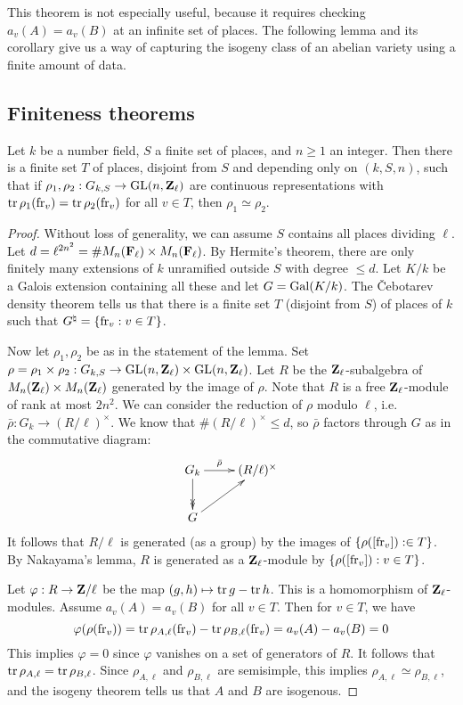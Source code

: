 This theorem is not especially useful, because it requires checking 
$a_v(A)=a_v(B)$ at an infinite set of places. The following lemma and its 
corollary give us a way of capturing the isogeny class of an abelian variety 
using a finite amount of data. 





\subsection{Finiteness theorems}

\begin{lemma}[Faltings]
Let $k$ be a number field, $S$ a finite set of places, and $n\geqslant 1$ an 
integer. Then there is a finite set $T$ of places, disjoint from $S$ and 
depending only on $(k,S,n)$, such that if 
$\rho_1,\rho_2:G_{k,S} \to \operatorname{GL}(n,\mathbf{Z}_\ell)$ are continuous representations 
with $\operatorname{tr}\rho_1(\mathrm{fr}_v) = \operatorname{tr} \rho_2(\mathrm{fr}_v)$ for all $v\in T$, then 
$\rho_1\simeq \rho_2$. 
\end{lemma}
\begin{proof}
Without loss of generality, we can assume $S$ contains all places dividing 
$\ell$. Let $d = \ell^{2 n^2} = \# M_n(\mathbf{F}_\ell)\times M_n(\mathbf{F}_\ell)$. By 
Hermite's theorem, there are only finitely many extensions of $k$ unramified 
outside $S$ with degree $\leqslant d$. Let $K/k$ be a Galois extension 
containing all these and let $G=\operatorname{Gal}(K/k)$. The \v Cebotarev density theorem 
tells us that there is a finite set $T$ (disjoint from $S$) of places of $k$ 
such that $G^\natural = \{\mathrm{fr}_v:v\in T\}$. 

Now let $\rho_1,\rho_2$ be as in the statement of the lemma. Set 
$\rho=\rho_1\times\rho_2:G_{k,S} \to \operatorname{GL}(n,\mathbf{Z}_\ell)\times \operatorname{GL}(n,\mathbf{Z}_\ell)$. 
Let $R$ be the $\mathbf{Z}_\ell$-subalgebra of 
$M_n(\mathbf{Z}_\ell)\times M_n(\mathbf{Z}_\ell)$ generated by the image of $\rho$. Note that 
$R$ is a free $\mathbf{Z}_\ell$-module of rank at most $2 n^2$. We can consider the 
reduction of $\rho$ modulo $\ell$, i.e. $\bar\rho:G_k \to (R/\ell)^\times$. We 
know that $\# (R/\ell)^\times \leqslant d$, so $\bar\rho$ factors through $G$ 
as in the commutative diagram: 
\[\xymatrix{
  G_k \ar[r]^-{\bar\rho} \ar@{->>}[d] 
    & (R/\ell)^\times \\
  G \ar[ur]
}\]
It follows that $R/\ell$ is generated (as a group) by the images of 
$\{\rho([\mathrm{fr}_v]):\in T\}$. By Nakayama's lemma, $R$ is generated as a 
$\mathbf{Z}_\ell$-module by $\{\rho([\mathrm{fr}_v]):v\in T\}$. 

Let $\varphi:R \to \mathbf{Z}/\ell$ be the map $(g,h)\mapsto \operatorname{tr} g-\operatorname{tr} h$. This 
is a homomorphism of $\mathbf{Z}_\ell$-modules. Assume $a_v(A)=a_v(B)$ for all 
$v\in T$. Then for $v\in T$, we have 
\[
  \varphi(\rho(\mathrm{fr}_v)) = \operatorname{tr} \rho_{A,\ell}(\mathrm{fr}_v) - \operatorname{tr}\rho_{B,\ell}(\mathrm{fr}_v) = a_v(A)-a_v(B) = 0 
\]
This implies $\varphi=0$ since $\varphi$ vanishes on a set of generators of 
$R$. It follows that $\operatorname{tr} \rho_{A,\ell} = \operatorname{tr}\rho_{B,\ell}$. Since 
$\rho_{A,\ell}$ and $\rho_{B,\ell}$ are semisimple, this implies 
$\rho_{A,\ell}\simeq \rho_{B,\ell}$, and the isogeny theorem tells us that 
$A$ and $B$ are isogenous. 
\end{proof}

